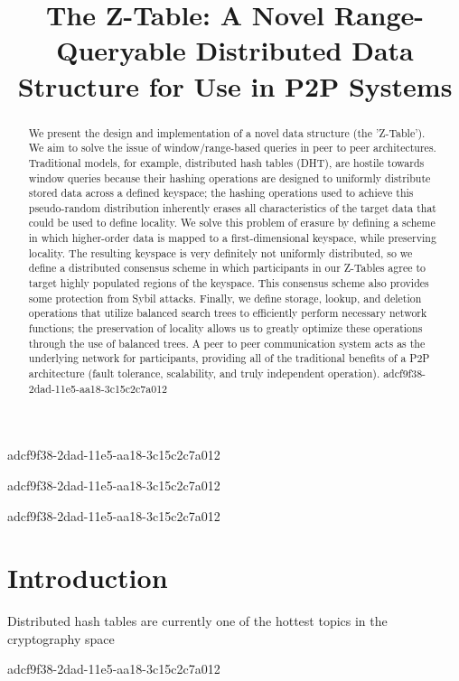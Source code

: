 \documentclass[12pt]{article}
\title{The Z-Table: A Novel Range-Queryable Distributed Data Structure for Use in P2P Systems}
\begin{document}
adcf9f38-2dad-11e5-aa18-3c15c2c7a012\maketitle
adcf9f38-2dad-11e5-aa18-3c15c2c7a012
\begin{abstract}
We present the design and implementation of a novel data structure (the 'Z-Table'). We aim to solve the issue of window/range-based queries in peer to peer architectures. Traditional models, for example,  distributed hash tables (DHT), are hostile towards window queries because their hashing operations are designed to uniformly distribute stored data across a defined keyspace; the hashing operations used to achieve this pseudo-random distribution inherently erases all characteristics of the target data that could be used to define locality. We solve this problem of erasure by defining a scheme in which higher-order data is mapped to a first-dimensional keyspace, while preserving locality. The resulting keyspace is very definitely not uniformly distributed, so we define a distributed consensus scheme in which participants in our Z-Tables agree to target highly populated regions of the keyspace. This consensus scheme also provides some protection from Sybil attacks. Finally, we define storage, lookup, and deletion operations that utilize balanced search trees to efficiently perform necessary network functions; the preservation of locality allows us to greatly optimize these operations through the use of balanced trees. A peer to peer communication system acts as the underlying network for participants, providing all of the traditional benefits of a P2P architecture (fault tolerance, scalability, and truly independent operation).
adcf9f38-2dad-11e5-aa18-3c15c2c7a012\end{abstract}


adcf9f38-2dad-11e5-aa18-3c15c2c7a012\newpage
\section{Introduction}
Distributed hash tables are currently one of the hottest topics in the cryptography space~\cite{Stoica:2001dj,Rowstron:2001ea,Ratnasamy:2001wn}

adcf9f38-2dad-11e5-aa18-3c15c2c7a012\printbibliography
\end{document}
